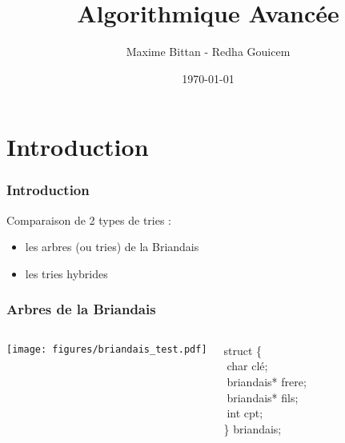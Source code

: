 \documentclass{beamer}
\title[AlgAv]{Algorithmique Avancée} %
\author{Maxime Bittan - Redha Gouicem} %
\date{\today} %
\begin{document}
\begin{frame}
\titlepage %
\end{frame}


\section{Introduction} %

\begin{frame}
\frametitle{Introduction}
Comparaison de 2 types de tries :
\begin{itemize}
  \item les arbres (ou tries) de la Briandais
  \item les tries hybrides
\end{itemize}
\end{frame}


\begin{frame}
\frametitle{Arbres de la Briandais}
\begin{columns}[c] %

\texttt{[image: figures/briandais\_test.pdf]}

struct \{\\
   $\;$char clé;\\
   $\;$briandais* frere;\\
   $\;$briandais* fils;\\
   $\;$int cpt;\\
\} briandais;

\end{columns}
\end{frame}
\end{document}
